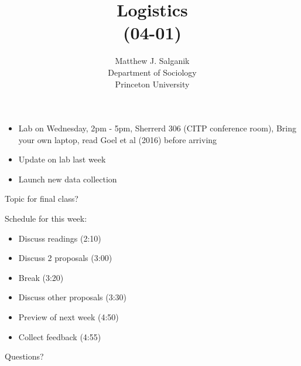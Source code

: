 \documentclass[aspectratio=169]{beamer}
\title[]{Logistics\\(04-01)}
\author[]{Matthew J. Salganik\\Department of Sociology\\Princeton University}
\date[]{Soc 596: Computational Social Science\\Fall 2016
\vfill
\begin{flushright}
\vspace{0.6in}
\texttt{[image: figures/cc.png]}
\end{flushright}
}
\def\vf{\vfill}
\begin{document}
\frame{\titlepage}
\begin{frame}

\begin{itemize}
\item Lab on Wednesday, 2pm - 5pm, Sherrerd 306 (CITP conference room), Bring your own laptop, read Goel et al (2016) before arriving
\pause
\item Update on lab last week
\pause
\item Launch new data collection
\end{itemize}

\end{frame}
\begin{frame}

Topic for final class?

\end{frame}
\begin{frame}

Schedule for this week:
\begin{itemize}
\item Discuss readings (2:10)
\item Discuss 2 proposals (3:00)
\item Break (3:20)
\item Discuss other proposals (3:30)
\item Preview of next week (4:50)
\item Collect feedback (4:55)
\end{itemize}

\vf
Questions?

\end{frame}
\end{document}
